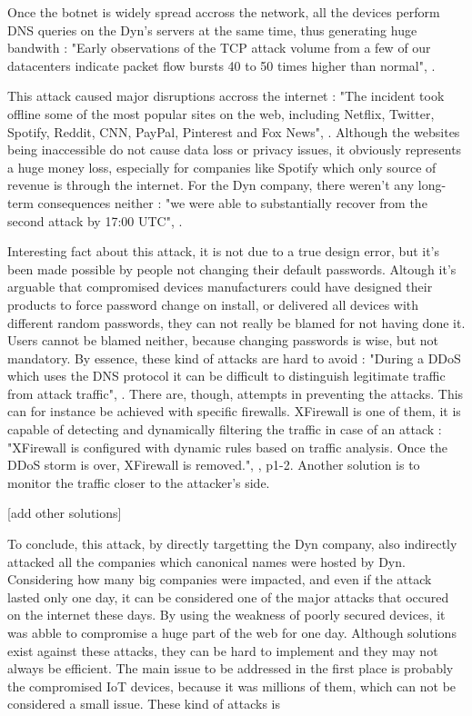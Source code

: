 \documentclass[a4paper,man,natbib,12]{apa6}
\begin{document}
\qquad Once the botnet is widely spread accross the network, all the devices perform DNS queries on the Dyn's servers at the same time, thus generating huge bandwith : "Early observations of the TCP attack volume from a few of our datacenters indicate packet flow bursts 40 to 50 times higher than normal", \cite{Dyn}. 

\qquad This attack caused major disruptions accross the internet : "The incident took offline some of the most popular sites on the web, including Netflix, Twitter, Spotify, Reddit, CNN, PayPal, Pinterest and Fox News", \cite{guardian}. Although the websites being inaccessible do not cause data loss or privacy issues, it obviously represents a huge money loss, especially for companies like Spotify which only source of revenue is through the internet. For the Dyn company, there weren't any long-term consequences neither : "we were able to substantially recover from the second attack by 17:00 UTC", \cite{Dyn}.

\qquad Interesting fact about this attack, it is not due to a true design error, but it's been made possible by people not changing their default passwords. Altough it's arguable that compromised devices manufacturers could have designed their products to force password change on install, or delivered all devices with different random passwords, they can not really be blamed for not having done it. Users cannot be blamed neither, because changing passwords is wise, but not mandatory. By essence, these kind of attacks are hard to avoid : "During a DDoS which uses the DNS protocol it can be difficult to distinguish legitimate traffic from attack traffic", \cite{Dyn}. There are, though, attempts in preventing the attacks. This can for instance be achieved with specific firewalls. XFirewall is one of them, it is capable of detecting and dynamically filtering the traffic in case of an attack : "XFirewall is configured with dynamic rules based on traffic analysis. Once the DDoS storm is over, XFirewall is removed.", \cite{XFirewall}, p1-2. Another solution is to monitor the traffic closer to the attacker's side. 

[add other solutions]

\qquad To conclude, this attack, by directly targetting the Dyn company, also indirectly attacked all the companies which canonical names were hosted by Dyn. Considering how many big companies were impacted, and even if the attack lasted only one day, it can be considered one of the major attacks that occured on the internet these days. By using the weakness of poorly secured devices, it was abble to compromise a huge part of the web for one day. Although solutions exist against these attacks, they can be hard to implement and they may not always be efficient. The main issue to be addressed in the first place is probably the compromised IoT devices, because it was millions of them, which can not be considered a small issue. These kind of attacks is 




\end{document}
